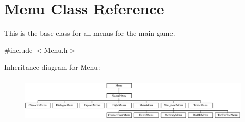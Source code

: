 \hypertarget{classMenu}{\section{Menu Class Reference}
\label{classMenu}
}


This is the base class for all menus for the main game.  




{\ttfamily \#include $<$Menu.\-h$>$}

Inheritance diagram for Menu\-:\begin{figure}[H]
\begin{center}
\leavevmode
\includegraphics[height=2.222222cm]{classMenu}
\end{center}
\end{figure}
